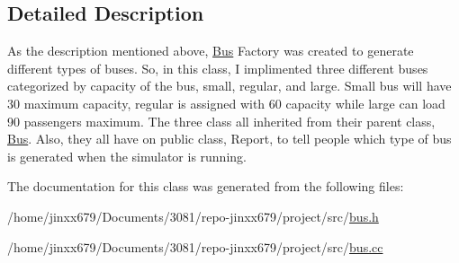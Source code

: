 \subsection{Detailed Description}
As the description mentioned above, \hyperlink{classBus}{Bus} Factory was created to generate different types of buses. So, in this class, I implimented three different buses categorized by capacity of the bus, small, regular, and large. Small bus will have 30 maximum capacity, regular is assigned with 60 capacity while large can load 90 passengers maximum. The three class all inherited from their parent class, \hyperlink{classBus}{Bus}. Also, they all have on public class, Report, to tell people which type of bus is generated when the simulator is running. 

The documentation for this class was generated from the following files\+:\begin{DoxyCompactItemize}
\item 
/home/jinxx679/\+Documents/3081/repo-\/jinxx679/project/src/\hyperlink{bus_8h}{bus.\+h}\item 
/home/jinxx679/\+Documents/3081/repo-\/jinxx679/project/src/\hyperlink{bus_8cc}{bus.\+cc}\end{DoxyCompactItemize}
